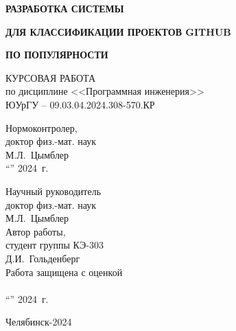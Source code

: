 \begin{adjustwidth}[]{0cm}{0cm}
\begin{center}
\begin{linespread}{1}




{
\large\textbf{РАЗРАБОТКА СИСТЕМЫ  }

\vspace{-5pt}

\large\textbf{ДЛЯ КЛАССИФИКАЦИИ ПРОЕКТОВ GITHUB}

\vspace{-5pt}

\large\textbf{ПО ПОПУЛЯРНОСТИ}

}
\vspace{2em}

КУРСОВАЯ РАБОТА \\
по дисциплине <<Программная инженерия>>\\
ЮУрГУ -- 09.03.04.2024.308-570.КР



\parbox[t]{7cm}{
Нормоконтролер,\\[0.5em]
доктор физ.-мат. наук \\[0.5em]
\underfield{} М.Л.~Цымблер \\[0.5em]
``\underline{\qquad}''\underfield{} 2024~г.
}
\hfill{}
\parbox[t]{7cm}{
Научный руководитель \\
доктор физ.-мат. наук\\[0.5em]
\underfield{} М.Л.~Цымблер \\[2.5em]
Автор работы, \\
студент группы КЭ-303\\[0.5em]
\underfield{} Д.И.~Гольденберг \\[2.5em]
Работа защищена с оценкой \\[0.5em]
\underfield{}  \\[0.5em]
``\underline{\qquad}''\underfield{} 2024~г.

}


Челябинск-2024

\end{linespread}
\end{center}
\end{adjustwidth}

\pagebreak
